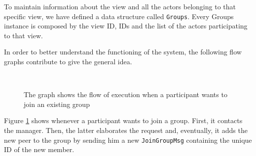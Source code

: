 \documentclass[conference]{IEEEtran}
\begin{document}
To maintain information about the view and all the actors belonging to that specific view, we have defined a data structure called \texttt{Groups}. Every Groups instance is composed by the view ID, IDs and the list of the actors participating to that view.

In order to better understand the functioning of the system, the following flow graphs contribute to give the general idea.
\begin{figure}[ht]%
	\centering
	\\%
	\caption{The graph shows the flow of execution when a participant
	wants to join an existing group}%
	\label{fig:join}%
\end{figure}
Figure \ref{fig:join} shows whenever a participant wants to join a group. First, it contacts the manager. Then, the latter elaborates the request and, eventually, it adds the new peer to the group by sending him a new \texttt{JoinGroupMsg} containing the unique ID of the new member.
\end{document}
